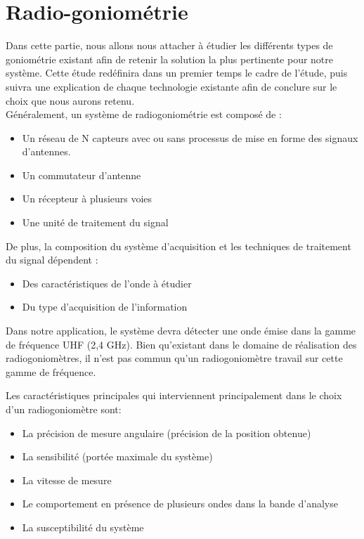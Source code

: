 \chapter{Radio-goniométrie}



Dans cette partie, nous allons nous attacher à étudier les différents types de goniométrie existant afin de retenir la solution la plus pertinente pour notre système. Cette étude redéfinira dans un premier temps le cadre de l’étude, puis suivra une explication de chaque technologie existante afin de conclure sur le choix que nous aurons retenu.
~\\

Généralement, un système de radiogoniométrie est composé de  :

\begin{itemize}
\item Un réseau de N capteurs avec ou sans processus de mise en forme des signaux d’antennes.

\item Un commutateur d’antenne
\item Un récepteur à plusieurs voies
\item Une unité de traitement du signal~\\

\end{itemize}


De plus, la composition du système d’acquisition et les techniques de traitement du signal dépendent :
\begin{itemize}
\item  Des caractéristiques de l’onde à étudier
\item  Du type d’acquisition de l’information~\\
\end{itemize}


Dans notre application, le système devra détecter une onde émise dans la gamme de fréquence UHF (2,4 GHz). Bien qu’existant dans le domaine de réalisation des radiogoniomètres, il n’est pas commun qu’un radiogoniomètre travail sur cette gamme de fréquence.

Les caractéristiques principales qui interviennent principalement dans le choix d’un radiogoniomètre sont:

\begin{itemize}
\item La précision de mesure angulaire (précision de la position obtenue)
\item La sensibilité (portée maximale du système) 
\item La vitesse de mesure
\item Le comportement en présence de plusieurs ondes dans la bande d’analyse
\item La susceptibilité du système~\\
\end{itemize}


